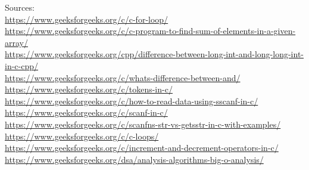 \documentclass{article}
\begin{document}
Sources: \\
\url{https://www.geeksforgeeks.org/c/c-for-loop/}\\
\url{https://www.geeksforgeeks.org/c/c-program-to-find-sum-of-elements-in-a-given-array/}\\
\url{https://www.geeksforgeeks.org/cpp/difference-between-long-int-and-long-long-int-in-c-cpp/}\\
\url{https://www.geeksforgeeks.org/c/whats-difference-between-and/}\\
\url{https://www.geeksforgeeks.org/c/tokens-in-c/}\\
\url{https://www.geeksforgeeks.org/c/how-to-read-data-using-sscanf-in-c/}\\
\url{https://www.geeksforgeeks.org/c/scanf-in-c/}\\
\url{https://www.geeksforgeeks.org/c/scanfns-str-vs-getsstr-in-c-with-examples/}\\
\url{https://www.geeksforgeeks.org/c/c-loops/}\\
\url{https://www.geeksforgeeks.org/c/increment-and-decrement-operators-in-c/}\\
\url{https://www.geeksforgeeks.org/dsa/analysis-algorithms-big-o-analysis/}\\
\end{document}
